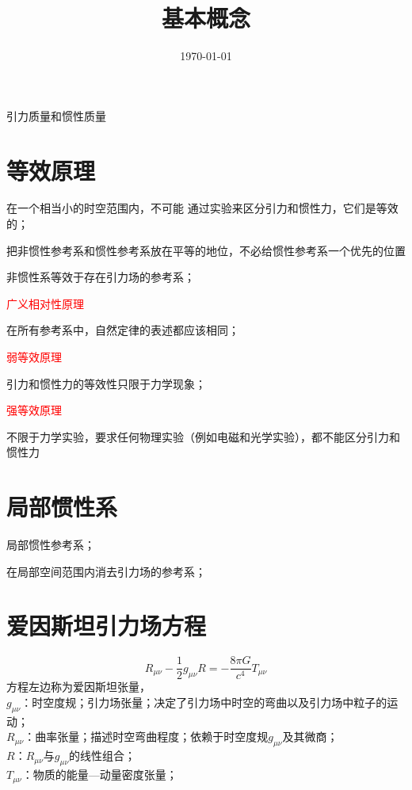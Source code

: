 \documentclass[12pt,a4paper]{article}
\title{基本概念}
\author{}
\date{\today}
\begin{document}
\maketitle

引力质量和惯性质量

\section{等效原理}
在一个相当小的时空范围内，不可能 通过实验来区分引力和惯性力，它们是等效的；

把非惯性参考系和惯性参考系放在平等的地位，不必给惯性参考系一个优先的位置

非惯性系等效于存在引力场的参考系；

\textcolor{red}{广义相对性原理}

在所有参考系中，自然定律的表述都应该相同；

\textcolor{red}{弱等效原理}

引力和惯性力的等效性只限于力学现象；

\textcolor{red}{强等效原理}

不限于力学实验，要求任何物理实验（例如电磁和光学实验），都不能区分引力和惯性力

\section{局部惯性系}
局部惯性参考系；

在局部空间范围内消去引力场的参考系；


\section{爱因斯坦引力场方程}
\begin{equation}
R_{\mu \nu} -\frac{1}{2} g_{\mu \nu} R = -\frac{8\pi G}{c^4} T_{\mu \nu}
\end{equation}
方程左边称为爱因斯坦张量，\\
$g_{\mu \nu}$：时空度规；引力场张量；决定了引力场中时空的弯曲以及引力场中粒子的运动；\\
$R_{\mu \nu}$：曲率张量；描述时空弯曲程度；依赖于时空度规$g_{\mu \nu}$及其微商；\\
$R$：$R_{\mu \nu}$与$g_{\mu \nu}$的线性组合；\\
$T_{\mu \nu}$：物质的能量—动量密度张量；
\end{document}
